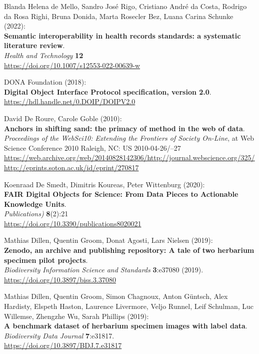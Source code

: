 \begin{thebibliography}{9}
Blanda Helena de Mello, Sandro José Rigo, Cristiano
André da Costa, Rodrigo da Rosa Righi, Bruna Donida, Marta Rosecler Bez,
Luana Carina Schunke (2022):\\
\textbf{Semantic interoperability in health records standards: a
systematic literature review}.\\
\emph{Health and Technology} \textbf{12}\\
\url{https://doi.org/10.1007/s12553-022-00639-w}

DONA Foundation (2018):\\
\textbf{Digital Object Interface Protocol specification, version 2.0}.\\
\url{https://hdl.handle.net/0.DOIP/DOIPV2.0}

David De Roure, Carole Goble (2010):\\
\textbf{Anchors in shifting sand: the primacy of method in the web of data}. \\
\emph{Proceedings of the WebSci10: Extending the Frontiers of Society On-Line},
at Web Science Conference 2010 Raleigh, NC: US 2010-04-26/--27\\
\url{https://web.archive.org/web/20140828142306/http://journal.webscience.org/325/}\\
\url{http://eprints.soton.ac.uk/id/eprint/270817} 


Koenraad De Smedt, Dimitris Koureas, Peter
Wittenburg (2020):\\
\textbf{FAIR Digital Objects for Science: From Data Pieces to Actionable
Knowledge Units}.\\
\emph{Publications)} \textbf{8}(2):21\\
\url{https://doi.org/10.3390/publications8020021}

Mathias Dillen, Quentin Groom, Donat Agosti, Lars Nielsen
(2019):\\
\textbf{Zenodo, an archive and publishing repository: A tale of two
herbarium specimen pilot projects}.\\
\emph{Biodiversity Information Science and Standards} \textbf{3}:e37080
(2019).\\
\url{https://doi.org/10.3897/biss.3.37080}

Mathias Dillen, Quentin Groom, Simon Chagnoux, Anton Güntsch, Alex Hardisty, Elspeth Haston, Laurence Livermore, Veljo Runnel, Leif Schulman, Luc Willemse, Zhengzhe Wu, Sarah Phillips (2019):\\
\textbf{A benchmark dataset of herbarium specimen images with label data}. 
\emph{Biodiversity Data Journal} \textbf{7}:e31817.\\
\url{https://doi.org/10.3897/BDJ.7.e31817}


\end{thebibliography}
